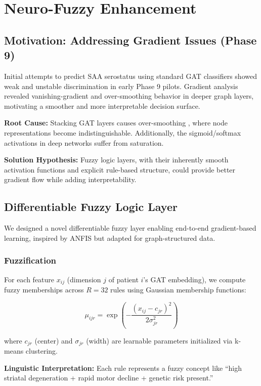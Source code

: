 \documentclass[journal,twoside,web]{ieeecolor}
\begin{document}
\section{Neuro-Fuzzy Enhancement}
\label{sec:neurofuzzy}

\subsection{Motivation: Addressing Gradient Issues (Phase 9)}
Initial attempts to predict SAA serostatus using standard GAT classifiers showed weak and unstable discrimination in early Phase 9 pilots. Gradient analysis revealed vanishing-gradient and over-smoothing behavior in deeper graph layers, motivating a smoother and more interpretable decision surface.

\textbf{Root Cause:} Stacking GAT layers causes over-smoothing \cite{li2018deeper}, where node representations become indistinguishable. Additionally, the sigmoid/softmax activations in deep networks suffer from saturation.

\textbf{Solution Hypothesis:} Fuzzy logic layers, with their inherently smooth activation functions and explicit rule-based structure, could provide better gradient flow while adding interpretability.

\subsection{Differentiable Fuzzy Logic Layer}
We designed a novel differentiable fuzzy layer enabling end-to-end gradient-based learning, inspired by ANFIS \cite{jang1993anfis} but adapted for graph-structured data.

\subsubsection{Fuzzification}
For each feature $x_{ij}$ (dimension $j$ of patient $i$'s GAT embedding), we compute fuzzy memberships across $R=32$ rules using Gaussian membership functions:

\begin{equation}
\mu_{ijr} = \exp\left(-\frac{(x_{ij} - c_{jr})^2}{2\sigma_{jr}^2}\right)
\end{equation}

where $c_{jr}$ (center) and $\sigma_{jr}$ (width) are learnable parameters initialized via k-means clustering.

\textbf{Linguistic Interpretation:} Each rule represents a fuzzy concept like ``high striatal degeneration + rapid motor decline + genetic risk present.''
\end{document}
